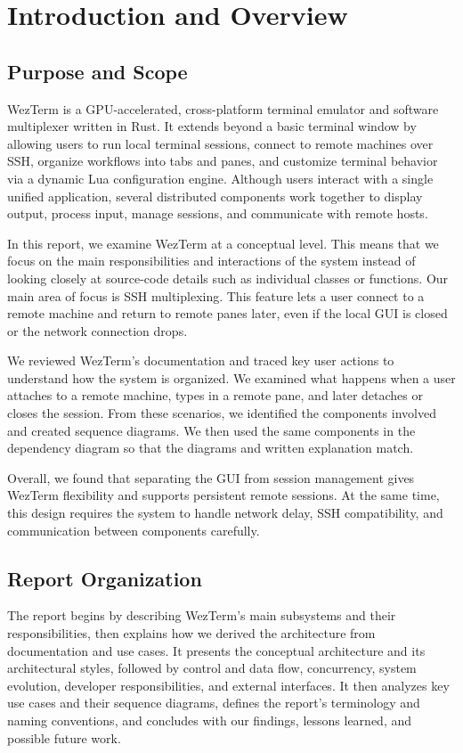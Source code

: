 \section{Introduction and Overview}
\label{sec:introduction}

\subsection{Purpose and Scope}
\label{sec:purpose}

WezTerm is a GPU-accelerated, cross-platform terminal emulator and software multiplexer written in Rust. It extends beyond a basic terminal window by allowing users to run local terminal sessions, connect to remote machines over SSH, organize workflows into tabs and panes, and customize terminal behavior via a dynamic Lua configuration engine. Although users interact with a single unified application, several distributed components work together to display output, process input, manage sessions, and communicate with remote hosts.

In this report, we examine WezTerm at a conceptual level. This means that we focus on the main responsibilities and interactions of the system instead of looking closely at source-code details such as individual classes or functions. Our main area of focus is SSH multiplexing. This feature lets a user connect to a remote machine and return to remote panes later, even if the local GUI is closed or the network connection drops.

We reviewed WezTerm’s documentation and traced key user actions to understand how the system is organized. We examined what happens when a user attaches to a remote machine, types in a remote pane, and later detaches or closes the session. From these scenarios, we identified the components involved and created sequence diagrams. We then used the same components in the dependency diagram so that the diagrams and written explanation match.

Overall, we found that separating the GUI from session management gives WezTerm flexibility and supports persistent remote sessions. At the same time, this design requires the system to handle network delay, SSH compatibility, and communication between components carefully.

\subsection{Report Organization}
\label{sec:organization}

The report begins by describing WezTerm’s main subsystems and their responsibilities, then explains how we derived the architecture from documentation and use cases. It presents the conceptual architecture and its architectural styles, followed by control and data flow, concurrency, system evolution, developer responsibilities, and external interfaces. It then analyzes key use cases and their sequence diagrams, defines the report’s terminology and naming conventions, and concludes with our findings, lessons learned, and possible future work.
